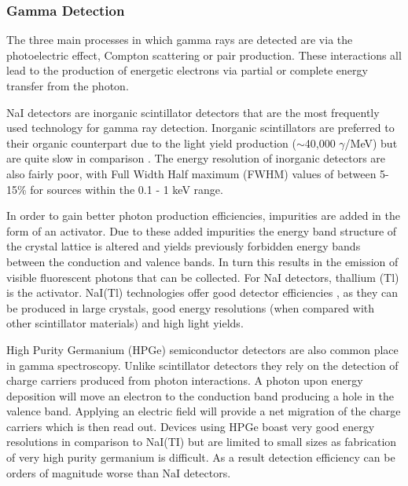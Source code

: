 \subsubsection{Gamma Detection}
The three main processes in which gamma rays are detected are via the photoelectric effect, Compton scattering or pair production. These interactions all lead to the production of energetic electrons via partial or complete energy transfer from the photon. %


NaI detectors are inorganic scintillator detectors that are the most frequently used technology for gamma ray detection. Inorganic scintillators are preferred to their organic counterpart due to the light yield production ($\sim$40,000 $\gamma$/MeV) but are quite slow in comparison \cite{knollRadiation}. The energy resolution of inorganic detectors are also fairly poor, with Full Width Half maximum (FWHM) values of between 5-15\% for sources within the 0.1 - 1 keV range. 

In order to gain better photon production efficiencies, impurities are added in the form of an activator. Due to these added impurities the energy band structure of the crystal lattice is altered and yields previously forbidden energy bands between the conduction and valence bands. In turn this results in the emission of visible fluorescent photons that can be collected. For NaI detectors, thallium (Tl) is the activator. NaI(Tl) technologies offer good detector efficiencies \cite{knollRadiation}, as they can be produced in large crystals, good energy resolutions (when compared with other scintillator materials) and high light yields.

High Purity Germanium (HPGe) semiconductor detectors are also common place in gamma spectroscopy. Unlike scintillator detectors they rely on the detection of charge carriers produced from photon interactions. A photon upon energy deposition will move an electron to the conduction band producing a hole in the valence band. Applying an electric field will provide a net migration of the charge carriers which is then read out. Devices using HPGe boast very good energy resolutions in comparison to NaI(TI) but are limited to small sizes as fabrication of very high purity germanium is difficult. As a result detection efficiency can be orders of magnitude worse than NaI detectors.

